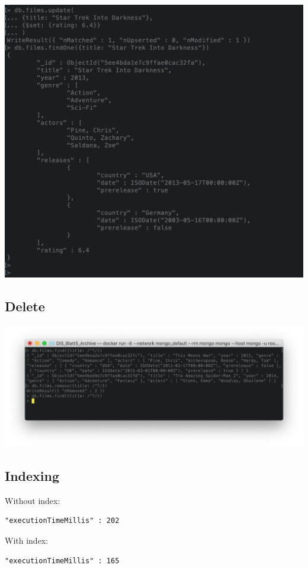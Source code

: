 \documentclass[ngerman]{dis-template-add}
\begin{document}
\includegraphics[scale=0.3]{update.png}

\subsection*{Delete}

\includegraphics[scale=0.3]{delete.png}

\subsection*{Indexing}

Without index: 
\begin{verbatim}
"executionTimeMillis" : 202
\end{verbatim}

With index:
\begin{verbatim}
"executionTimeMillis" : 165
\end{verbatim}
\end{document}
